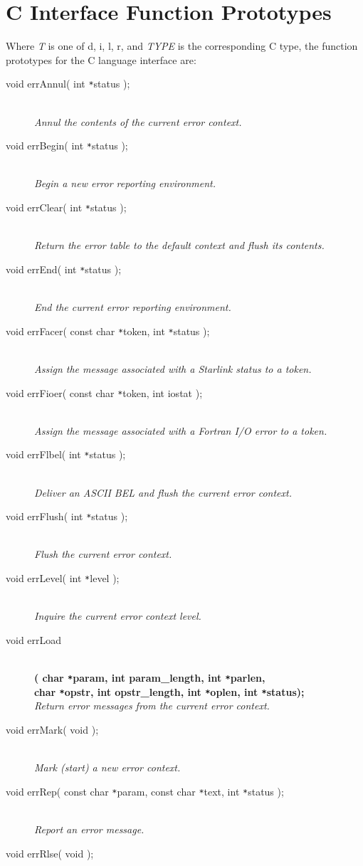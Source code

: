 \documentclass[twoside,11pt]{starlink}
\providecommand{\listline}{\hspace{1pt}\\}
\begin{document}
\section{C Interface Function Prototypes} \label{C_sect}
Where \textit{T} is one of d, i, l, r, and \textit{TYPE} is the corresponding C
type, the function prototypes for the C language interface are:
\begin{description}
\item[void errAnnul( int \texttt{*}status );] \listline
\textit{Annul the contents of the current error context.}
\item[void errBegin( int \texttt{*}status );] \listline
\textit{Begin a new error reporting environment.}
\item[void errClear( int \texttt{*}status );] \listline
\textit{Return the error table to the default context and flush its contents.}
\item[void errEnd( int \texttt{*}status );] \listline
\textit{End the current error reporting environment.}
\item[void errFacer( const char \texttt{*}token, int \texttt{*}status );] \listline
\textit{Assign the message associated with a Starlink status to a token.}
\item[void errFioer( const char \texttt{*}token, int iostat );] \listline
\textit{Assign the message associated with a Fortran I/O error to a token.}
\item[void errFlbel( int \texttt{*}status );] \listline
\textit{Deliver an ASCII BEL and flush the current error context.}
\item[void errFlush( int \texttt{*}status );] \listline
\textit{Flush the current error context.}
\item[void errLevel( int \texttt{*}level );] \listline
\textit{Inquire the current error context level.}
\item[void errLoad] \listline
\textbf{( char \texttt{*}param, int param\_length, int
\texttt{*}parlen,  {\listline}
char \texttt{*}opstr, int opstr\_length, int \texttt{*}oplen,
int \texttt{*}status);} \\
\textit{Return error messages from the current error context.}
\item[void errMark( void );] \listline
\textit{Mark (start) a new error context.}
\item[void errRep( const char \texttt{*}param, const char \texttt{*}text,
int \texttt{*}status );] \listline
\textit{Report an error message.}
\item[void errRlse( void );] \listline

\end{description}
\end{document}
